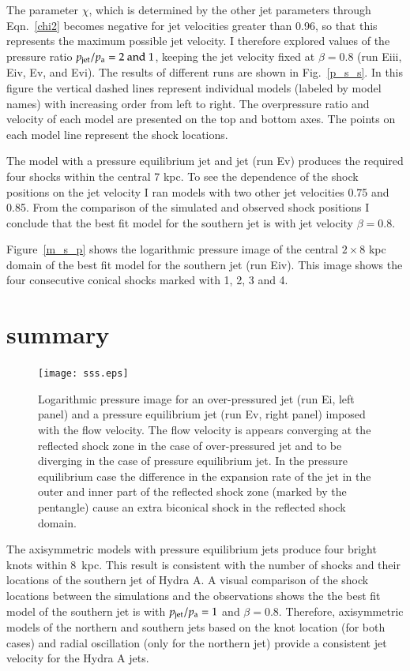 The parameter $\chi$, which is determined by the other jet parameters through Eqn.~\ref{chi2} becomes negative for jet velocities greater than 0.96, so that this represents the maximum possible jet velocity.  I therefore explored values of  the pressure ratio $p_\mathrm{jet}/p_\mathrm{a} = 2 \rm  \ and \ 1$, keeping the jet velocity fixed at $\beta = 0.8$ (run Eiii, Eiv, Ev, and Evi). The results of different runs are shown in Fig.~\ref{p_s_s}. In this figure the vertical dashed lines represent individual models (labeled by model names) with increasing order from left to right. The overpressure ratio and velocity of each model are presented on the top and bottom axes. The points on each model line represent the shock locations. 

The model with a pressure equilibrium jet and jet (run Ev) produces the required four shocks within the central 7 kpc. To see the dependence of the shock positions on the jet velocity I  ran models with two other jet velocities 0.75 and 0.85. From the comparison of the simulated and observed shock positions I conclude that the best fit model for the southern jet is with jet velocity $\beta = 0.8$. 

Figure~\ref{m_s_p} shows the logarithmic pressure image of the central $2\times8$ kpc domain of the best fit model for the southern jet (run Eiv). This image shows the four consecutive conical shocks marked with 1, 2, 3 and 4.


\section{summary}
\begin{figure}[ht!]
\texttt{[image: sss.eps]}
\caption{Logarithmic pressure image for an over-pressured jet (run Ei, left panel) and a pressure equilibrium jet (run Ev, right panel) imposed with the flow velocity. The flow velocity is appears converging at the reflected shock zone in the case of over-pressured jet and to be diverging in the case of pressure equilibrium jet. In the pressure equilibrium case the difference in the expansion rate of the jet in the outer and inner part of the reflected shock zone (marked by the pentangle) cause an extra biconical shock in the reflected shock domain.}
\label{s_s}
\end{figure}

The axisymmetric models with pressure equilibrium jets produce four bright knots within 8~kpc. This result is consistent with the number of shocks and their locations of the southern jet of Hydra A. A visual comparison of the shock locations between the simulations and the observations shows the the best fit model of the southern jet is with $p_{\rm jet}/p_{\rm a} =1$ and $\beta = 0.8$. Therefore, axisymmetric models of the northern and southern jets based on the knot location (for both cases) and radial oscillation (only for the northern jet) provide a consistent jet velocity for the Hydra A jets. 

